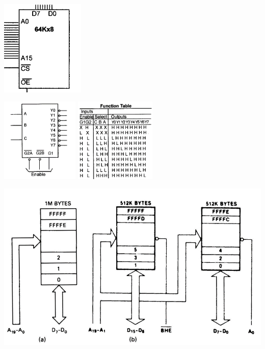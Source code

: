 \documentclass[10pt,a4paper]{article}
\begin{document}
\begin{CJK}{UTF8}{song}
\begin{twocolumn}
\begin{tcolorbox}[title=RAM\&ROM]
				\includegraphics[width=0.3\textwidth]{ROMC.png}
		\end{tcolorbox}
		\begin{tcolorbox}[title=74LS138 38译码器]
			\includegraphics[height=4cm]{38G.png}
			\includegraphics[height=4cm]{38T.png}
		\end{tcolorbox}
		\begin{tcolorbox}[title=8086存储组织]
			\centering
			\includegraphics[width=\linewidth]{eobanks.png}

\end{tcolorbox}
\end{twocolumn}
\end{CJK}
\end{document}
